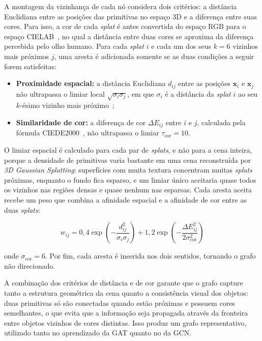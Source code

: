 A montagem da vizinhança de cada nó considera dois critérios: a distância Euclidiana entre as posições das primitivas no espaço 3D e a diferença entre suas cores. Para isso, a cor de cada \emph{splat} é antes convertida do espaço RGB para o espaço CIELAB~\cite{cie2004colorimetry}, no qual a distância entre duas cores se aproxima da diferença percebida pelo olho humano. Para cada \emph{splat} $i$ e cada um dos seus $k = 6$ vizinhos mais próximos $j$, uma aresta é adicionada somente se as duas condições a seguir forem satisfeitas:

\begin{itemize}
    \item \textbf{Proximidade espacial:} a distância Euclidiana $d_{ij}$ entre as posições $\mathbf{x}_i$ e $\mathbf{x}_j$ não ultrapassa o limiar local $\sqrt{\sigma_i \sigma_j}$, em que $\sigma_i$ é a distância da \emph{splat} $i$ ao seu $k$-ésimo vizinho mais próximo~\cite{zelnik2004self};
    \item \textbf{Similaridade de cor:} a diferença de cor $\Delta E_{ij}$ entre $i$ e $j$, calculada pela fórmula CIEDE2000~\cite{sharma2005ciede2000}, não ultrapassa o limiar $\tau_{\text{cor}} = 10$.
\end{itemize}

O limiar espacial é calculado para cada par de \emph{splats}, e não para a cena inteira, porque a densidade de primitivas varia bastante em uma cena reconstruída por \textit{3D Gaussian Splatting}: superfícies com muita textura concentram muitas \emph{splats} próximas, enquanto o fundo fica esparso, e um limiar único aceitaria quase todos os vizinhos nas regiões densas e quase nenhum nas esparsas. Cada aresta aceita recebe um peso que combina a afinidade espacial e a afinidade de cor entre as duas \emph{splats}:

\[
w_{ij} = 0{,}4 \exp\left(-\frac{d_{ij}^2}{\sigma_i \sigma_j}\right) + 1{,}2 \exp\left(-\frac{\Delta E_{ij}^2}{2\sigma_{\text{cor}}^2}\right)
\]

onde $\sigma_{\text{cor}} = 6$. Por fim, cada aresta é inserida nos dois sentidos, tornando o grafo não direcionado.

A combinação dos critérios de distância e de cor garante que o grafo capture tanto a estrutura geométrica da cena quanto a consistência visual dos objetos: duas primitivas só são conectadas quando estão próximas e possuem cores semelhantes, o que evita que a informação seja propagada através da fronteira entre objetos vizinhos de cores distintas. Isso produz um grafo representativo, utilizado tanto no aprendizado da GAT quanto no da GCN.

